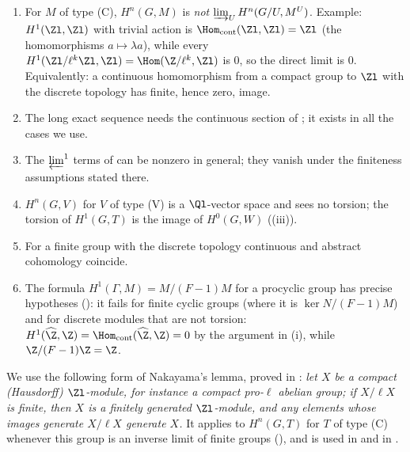 \begin{warning}\label{warn:cohomology:pitfalls}
\begin{enumerate}[label=(\roman*)]
\item For $M$ of type (C), $H^n(G,M)$ is \emph{not} $\varinjlim_UH^n(G/U,M^U)$. Example: $H^1(\Zl,\Zl)$ with trivial action is $\Hom_{\mathrm{cont}}(\Zl,\Zl)=\Zl$ (the
homomorphisms $a\mapsto\lambda a$), while every $H^1(\Zl/\ell^k\Zl,\Zl)=\Hom(\Z/\ell^k,\Zl)$ is $0$, so the direct limit is $0$. Equivalently: a continuous
homomorphism from a compact group to $\Zl$ with the discrete topology has finite, hence zero, image.
\item The long exact sequence needs the continuous section of ; it exists in all the cases we use.
\item The $\varprojlim^1$ terms of  can be nonzero in general; they vanish under the finiteness assumptions stated there.
\item $H^n(G,V)$ for $V$ of type (V) is a $\Ql$-vector space and sees no torsion; the torsion of $H^1(G,T)$ is the image of $H^0(G,W)$
((iii)).
\item For a finite group with the discrete topology continuous and abstract cohomology coincide.
\item The formula $H^1(\Gamma,M)=M/(F-1)M$ for a procyclic group has precise hypotheses (): it fails for finite cyclic groups
(where it is $\ker N/(F-1)M$) and for discrete modules that are not torsion: $H^1(\widehat\Z,\Z)=\Hom_{\mathrm{cont}}(\widehat\Z,\Z)=0$ by the argument in (i), while
$\Z/(F-1)\Z=\Z$.
\end{enumerate}
\end{warning}

\begin{remark}\label{rem:cohomology:top-nakayama}
We use the following form of Nakayama's lemma, proved in : \emph{let $X$ be a compact (Hausdorff) $\Zl$-module, for instance a compact pro-$\ell$ abelian
group; if $X/\ell X$ is finite, then $X$ is a finitely generated $\Zl$-module, and any elements whose images generate $X/\ell X$ generate $X$.} It applies to
$H^n(G,T)$ for $T$ of type (C) whenever this group is an inverse limit of finite groups (), and is used in
 and in .
\end{remark}

